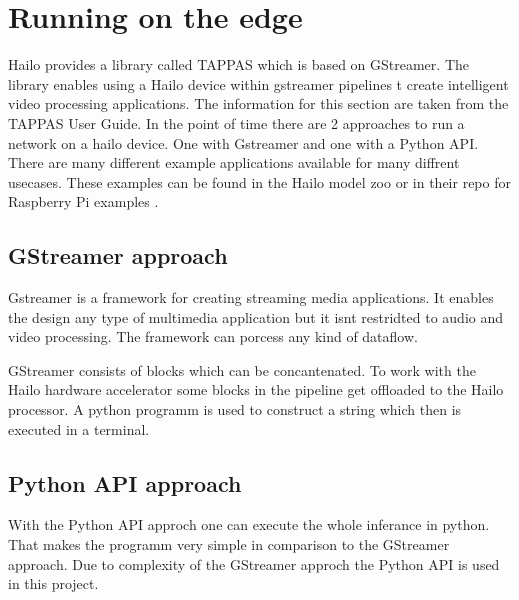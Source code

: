 \section{Running on the edge}

Hailo provides a library called TAPPAS which is based on GStreamer.
The library enables using a Hailo device within gstreamer pipelines t create intelligent video processing applications.
The information for this section are taken from the TAPPAS User Guide.
In the point of time there are 2 approaches to run a network on a hailo device.
One with Gstreamer and one with a Python API.
There are many different example applications available for many diffrent usecases.
These examples can be found in the Hailo model zoo\cite{hailo_model_zoo} or in their repo for Raspberry Pi examples \cite{hailo_rpi5_examples}.


\subsection{GStreamer approach}

Gstreamer is a framework for creating streaming media applications.
It enables the design any type of multimedia application but it isnt restridted to audio and video processing.
The framework can porcess any kind of dataflow.

GStreamer consists of blocks which can be concantenated.
To work with the Hailo hardware accelerator some blocks in the pipeline get offloaded to the Hailo processor.
A python programm is used to construct a string which then is executed in a terminal.


\subsection{Python API approach}

With the Python API approch one can execute the whole inferance in python.
That makes the programm very simple in comparison to the GStreamer approach.
Due to complexity of the GStreamer approch the Python API is used in this project.